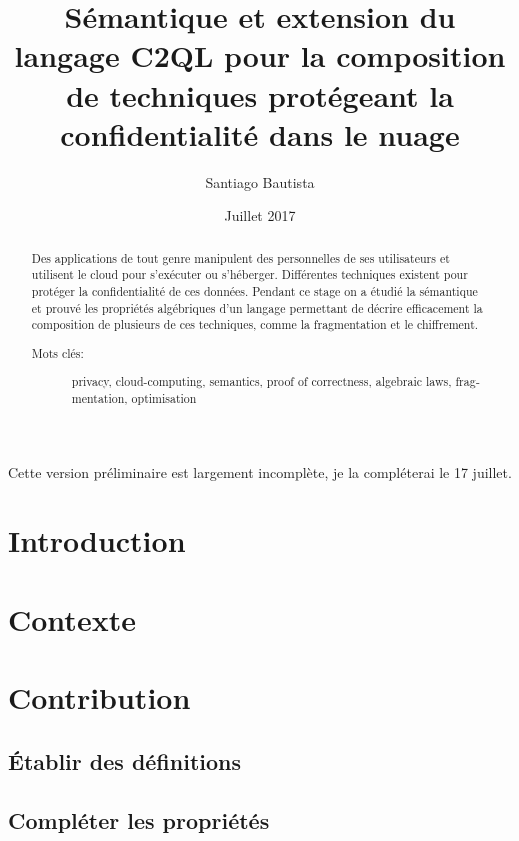 \documentclass[a4paper,11pt]{article}
\author{Santiago Bautista}
\date{Juillet 2017}
\title{Sémantique et extension du langage C2QL pour la composition de techniques protégeant la confidentialité dans le nuage}
\begin{document}
\maketitle
Cette version préliminaire est largement incomplète,
je la compléterai le 17 juillet.
\begin{abstract}
	Des applications de tout genre manipulent des personnelles de ses utilisateurs
	et utilisent le cloud pour s'exécuter ou s'héberger.
	Différentes techniques existent pour protéger la confidentialité de ces données.
	Pendant ce stage on a étudié la sémantique et prouvé les propriétés algébriques d'un langage permettant de décrire
	efficacement la composition de plusieurs de ces techniques, comme la fragmentation et le chiffrement.
	\begin{description}
		\item[Mots clés:]{\begin{otherlanguage}{english}
				privacy, cloud-computing, semantics, proof of correctness, algebraic laws, fragmentation, optimisation
			\end{otherlanguage}} 
	\end{description} 
	
\end{abstract}

\tableofcontents
\pagebreak

\section{Introduction}


\section{Contexte}
\label{context}


\section{Contribution}


\subsection{Établir des définitions}
\label{defs}


\subsection{Compléter les propriétés}
\label{compl}

\end{document}
